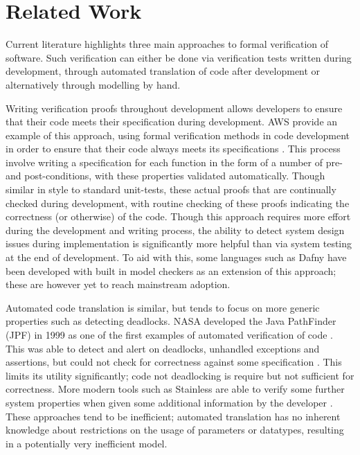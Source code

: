\section{Related Work}


Current literature highlights three main approaches to formal verification of software. Such verification can either be done via verification tests written during development, through automated translation of code after development or alternatively through modelling by hand.

Writing verification proofs throughout development allows developers to ensure that their code meets their specification during development.
AWS provide an example of this approach, using formal verification methods in code development in order to ensure that their code always meets its specifications \cite{Amazon1,Amazon2}. This process involve writing a specification for each function in the form of a number of pre- and post-conditions, with these properties validated automatically. Though similar in style to standard unit-tests, these actual proofs that are continually checked during development, with routine checking of these proofs indicating the correctness (or otherwise) of the code.
Though this approach requires more effort during the development and writing process, the ability to detect system design issues during implementation is significantly more helpful than via system testing at the end of development. To aid with this, some languages such as Dafny \cite{Dafny} have been developed with built in model checkers as an extension of this approach; these are however yet to reach mainstream adoption.

Automated code translation is similar, but tends to focus on more generic properties such as detecting deadlocks. NASA developed the Java PathFinder (JPF) in 1999 as one of the first examples of automated verification of code \cite{NASA1}. This was able to detect and alert on deadlocks, unhandled exceptions and assertions, but could not check for correctness against some specification \cite{NASA2}. This limits its utility significantly; code not deadlocking is require but not sufficient for correctness. More modern tools such as Stainless are able to verify some further system properties when given some additional information by the developer \cite{C4DT}. These approaches tend to be inefficient; automated translation has no inherent knowledge about restrictions on the usage of parameters or datatypes, resulting in a potentially very inefficient model.

